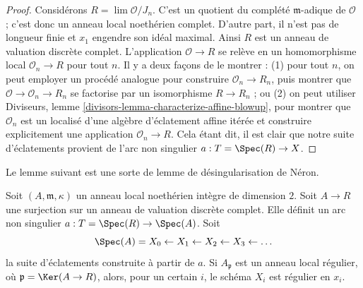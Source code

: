 \begin{proof}
\medskip\noindent Considérons $R = \lim \mathcal{O}/J_n$. C'est un quotient du complété $\mathfrak m$-adique de $\mathcal{O}$ ; c'est donc un anneau local noethérien complet. D'autre part, il n'est pas de longueur finie et $x_1$ engendre son idéal maximal. Ainsi $R$ est un anneau de valuation discrète complet. L'application $\mathcal{O} \to R$ se relève en un homomorphisme local $\mathcal{O}_n \to R$ pour tout $n$. Il y a deux façons de le montrer : (1) pour tout $n$, on peut employer un procédé analogue pour construire $\mathcal{O}_n \to R_n$, puis montrer que $\mathcal{O} \to \mathcal{O}_n \to R_n$ se factorise par un isomorphisme $R \to R_n$ ; ou (2) on peut utiliser Diviseurs, lemme \ref{divisors-lemma-characterize-affine-blowup}, pour montrer que $\mathcal{O}_n$ est un localisé d'une algèbre d'éclatement affine itérée et construire explicitement une application $\mathcal{O}_n \to R$. Cela étant dit, il est clair que notre suite d'éclatements provient de l'arc non singulier $a : T = \Spec(R) \to X$. \end{proof}

\noindent Le lemme suivant est une sorte de lemme de désingularisation de N\'eron.

\begin{lemma} \label{lemma-sequence-blowups-along-arc-becomes-nonsingular} Soit $(A, \mathfrak m, \kappa)$ un anneau local noethérien intègre de dimension $2$. Soit $A \to R$ une surjection sur un anneau de valuation discrète complet. Elle définit un arc non singulier $a : T = \Spec(R) \to \Spec(A)$. Soit $$
\Spec(A) = X_0 \leftarrow X_1 \leftarrow X_2 \leftarrow X_3 \leftarrow \ldots
$$ la suite d'éclatements construite à partir de $a$. Si $A_\mathfrak p$ est un anneau local régulier, où $\mathfrak p = \Ker(A \to R)$, alors, pour un certain $i$, le schéma $X_i$ est régulier en $x_i$. \end{lemma}


